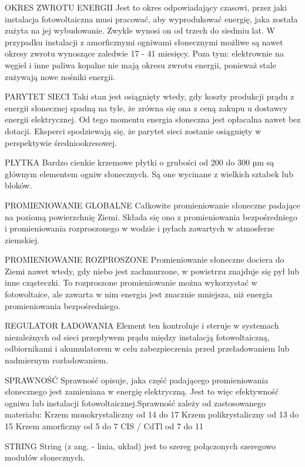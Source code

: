 \documentclass[12pt,a4paper]{article}
\begin{document}
OKRES ZWROTU ENERGII
Jest to okres odpowiadający czasowi, przez jaki instalacja fotowoltaiczna musi pracować, aby wyprodukować energię, jaka została zużyta na jej wybudowanie. Zwykle wynosi on od trzech do siedmiu lat. W przypadku instalacji z amorficznymi ogniwami słonecznymi możliwe są nawet okresy zwrotu wynoszące zaledwie 17 - 41 miesięcy. Poza tym: elektrownie na węgiel i inne paliwa kopalne nie mają okresu zwrotu energii, ponieważ stale zużywają nowe nośniki energii.


PARYTET SIECI
Taki stan jest osiągnięty wtedy, gdy koszty produkcji prądu z energii słonecznej spadną na tyle, że zrówna się ona z ceną zakupu u dostawcy energii elektrycznej. Od tego momentu energia słoneczna jest opłacalna nawet bez dotacji. Eksperci spodziewają się, że parytet sieci zostanie osiągnięty w perspektywie średniookresowej.


PŁYTKA
Bardzo cienkie krzemowe płytki o grubości od 200 do 300 µm są głównym elementem ogniw słonecznych. Są one wycinane z wielkich sztabek lub bloków.


PROMIENIOWANIE GLOBALNE
Całkowite promieniowanie słoneczne padające na poziomą powierzchnię Ziemi. Składa się ono z promieniowania bezpośredniego i promieniowania rozproszonego w wodzie i pyłach zawartych w atmosferze ziemskiej.


PROMIENIOWANIE ROZPROSZONE
Promieniowanie słoneczne dociera do Ziemi nawet wtedy, gdy niebo jest zachmurzone, w powietrzu znajduje się pył lub inne cząsteczki. To rozproszone promieniowanie można wykorzystać w fotowoltaice, ale zawarta w nim energia jest znacznie mniejsza, niż energia promieniowania bezpośredniego.


REGULATOR ŁADOWANIA
Element ten kontroluje i steruje w systemach niezależnych od sieci przepływem prądu między instalacją fotowoltaiczną, odbiornikami i akumulatorem w celu zabezpieczenia przed przeładowaniem lub nadmiernym rozładowaniem.


SPRAWNOŚĆ
Sprawność opisuje, jaka część padającego promieniowania słonecznego jest zamieniana w energię elektryczną. Jest to więc efektywność ogniwa lub instalacji fotowoltaicznej.Sprawność zależy od zastosowanego materiału:
Krzem monokrystaliczny	od 14 do 17%
Krzem polikrystaliczny	od 13 do 15%
Krzem amorficzny	od 5 do 7%
CIS / CdTl	od 7 do 11%


STRING
String (z ang. - linia, układ) jest to szereg połączonych szeregowo modułów słonecznych.
\end{document}
